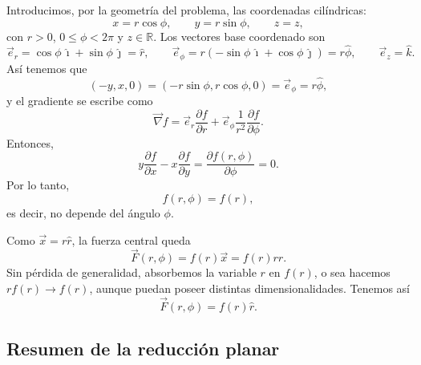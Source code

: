 \documentclass[../apunte_mecanica_clasica.tex]{subfiles}%
\begin{document}
Introducimos, por la geometría del problema, las coordenadas cilíndricas:
\begin{equation}
    x=r\cos\phi,
    \qquad
    y=r\sin\phi,
    \qquad
    z=z,
    \label{eq:fcbk-coordenadas-cilindricas}
\end{equation}
con $r>0$, $0\leq \phi<2\pi$ y $z\in\mathbb{R}$. Los vectores base coordenado son
\begin{equation}
    \vec e_r=\cos\phi\,\hat{\imath}+\sin\phi\,\hat{\jmath}=\hat r,
    \qquad
    \vec e_\phi=r(-\sin\phi\,\hat{\imath}+\cos\phi\,\hat{\jmath})=r\hat\phi,
    \qquad
    \vec e_z=\hat{k}.
    \label{eq:fcbk-bases-cilindricas}
\end{equation}
Así tenemos que
\begin{equation}
    (-y,x,0)=(-r\sin\phi,r\cos\phi,0)=\vec e_\phi=r\hat\phi,
    \label{eq:fcbk-vector-tangente-cilindrico}
\end{equation}
y el gradiente se escribe como
\begin{equation}
    \vec\nabla f = \vec e_r\frac{\partial f}{\partial r}
    + \vec e_\phi\frac{1}{r^2}\frac{\partial f}{\partial \phi}.
    \label{eq:fcbk-gradiente-f-cilindrico}
\end{equation}
Entonces,
\begin{equation}
    y\frac{\partial f}{\partial x}-x\frac{\partial f}{\partial y}
    =\frac{\partial f(r,\phi)}{\partial \phi}=0.
    \label{eq:fcbk-f-no-depende-phi}
\end{equation}
Por lo tanto,
\begin{equation}
    f(r,\phi)=f(r),
    \label{eq:fcbk-f-de-r}
\end{equation}
es decir, no depende del ángulo $\phi$.

Como $\vec x=r\hat r$, la fuerza central queda
\begin{equation}
    \vec F(r,\phi)=f(r)\vec x=f(r)r\hat r.
    \label{eq:fcbk-fuerza-fr-rhat-intermedia}
\end{equation}
Sin pérdida de generalidad, absorbemos la variable $r$ en $f(r)$, o sea hacemos $rf(r)\to f(r)$, aunque puedan poseer distintas dimensionalidades. Tenemos así
\begin{equation}
    \vec F(r,\phi)=f(r)\hat r.
    \label{eq:fcbk-fuerza-central-radial}
\end{equation}

\subsection{Resumen de la reducción planar}
\end{document}

